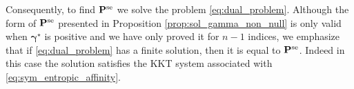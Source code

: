 
Consequently, to find $\mathbf{P}^{\mathrm{se}}$ we solve the problem \eqref{eq:dual_problem}. Although the form of $\mathbf{P}^{\mathrm{se}}$ presented in Proposition \ref{prop:sol_gamma_non_null} is only valid when $\bm{\gamma}^\star$ is positive and we have only proved it for $n-1$ indices, we emphasize that if \eqref{eq:dual_problem} has a finite solution, then it is equal to $\mathbf{P}^{\mathrm{se}}$. Indeed in this case the solution satisfies the KKT system associated with \eqref{eq:sym_entropic_affinity}.
  
